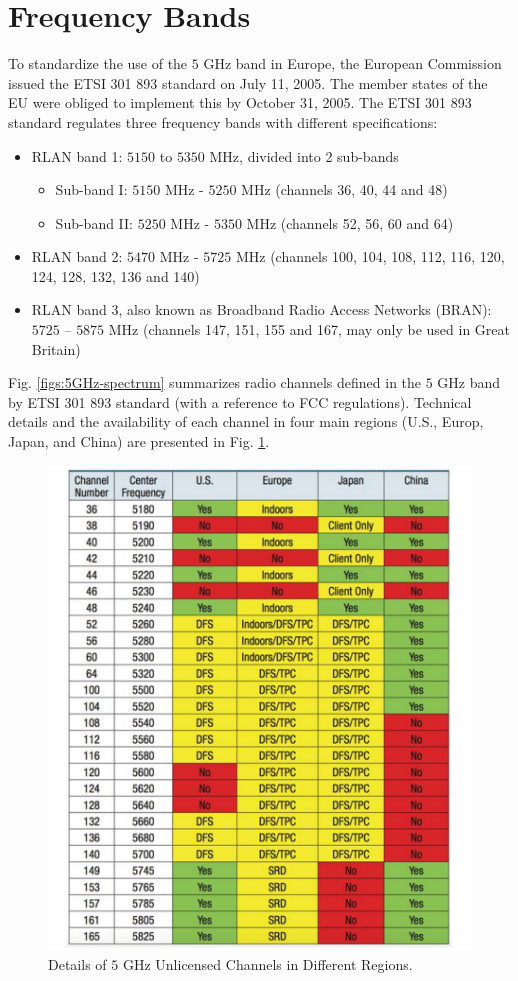 \section{Frequency Bands}

To standardize the use of the $5$ GHz band in Europe, the European Commission issued the ETSI 301 893 standard on July 11, 2005. The member states of the EU were obliged to implement this by October 31, 2005. The ETSI 301 893 standard regulates three frequency bands with different specifications:
\begin{itemize}
\item
RLAN band 1: $5150$ to $5350$ MHz, divided into 2 sub-bands
\begin{itemize}
\item
Sub-band I: $5150$ MHz - $5250$ MHz (channels 36, 40, 44 and 48) 
\item
Sub-band II: $5250$ MHz - $5350$ MHz (channels 52, 56, 60 and 64) 
\end{itemize}
\item
RLAN band 2: $5470$ MHz - $5725$ MHz (channels 100, 104, 108, 112, 116, 120, 124, 128, 132, 136 and 140)
\item
RLAN band 3, also known as Broadband Radio Access Networks (BRAN): $5725$ – $5875$ MHz (channels 147, 151, 155 and 167, may only be used in Great Britain)
\end{itemize}

Fig. \ref{figs:5GHz-spectrum} summarizes radio channels defined in the $5$ GHz band by ETSI 301 893 standard (with a reference to FCC regulations). Technical details and the availability of each channel in four main regions (U.S., Europ, Japan, and China) are presented in Fig. \ref{figs:5GHz-spectrum-table}.

\begin{figure}[!t]
	\centering
	\includegraphics[width=0.85\columnwidth]{figures2/5GHz-spectrum-table.pdf}
	\caption{Details of $5$ GHz Unlicensed Channels in Different Regions.}
	\label{figs:5GHz-spectrum-table}
\end{figure}


